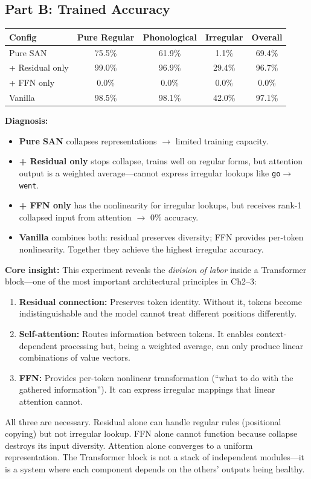 \subsection{Part B: Trained Accuracy}

\begin{center}
\begin{tabular}{lcccc}
\toprule
\textbf{Config} & \textbf{Pure Regular} & \textbf{Phonological} & \textbf{Irregular} & \textbf{Overall} \\
\midrule
Pure SAN & 75.5\% & 61.9\% & 1.1\% & 69.4\% \\
+ Residual only & 99.0\% & 96.9\% & 29.4\% & 96.7\% \\
+ FFN only & 0.0\% & 0.0\% & 0.0\% & 0.0\% \\
Vanilla & 98.5\% & 98.1\% & 42.0\% & 97.1\% \\
\bottomrule
\end{tabular}
\end{center}

\textbf{Diagnosis:}
\begin{itemize}
\item \textbf{Pure SAN} collapses representations $\to$ limited training capacity.
\item \textbf{+ Residual only} stops collapse, trains well on regular forms, but attention output is a weighted average---cannot express irregular lookups like \texttt{go}$\to$\texttt{went}.
\item \textbf{+ FFN only} has the nonlinearity for irregular lookups, but receives rank-1 collapsed input from attention $\to$ 0\% accuracy.
\item \textbf{Vanilla} combines both: residual preserves diversity; FFN provides per-token nonlinearity. Together they achieve the highest irregular accuracy.
\end{itemize}

\textbf{Core insight:} This experiment reveals the \emph{division of labor} inside a Transformer block---one of the most important architectural principles in Ch2--3:
\begin{enumerate}
\item \textbf{Residual connection:} Preserves token identity. Without it, tokens become indistinguishable and the model cannot treat different positions differently.
\item \textbf{Self-attention:} Routes information between tokens. It enables context-dependent processing but, being a weighted average, can only produce linear combinations of value vectors.
\item \textbf{FFN:} Provides per-token nonlinear transformation (``what to do with the gathered information''). It can express irregular mappings that linear attention cannot.
\end{enumerate}
All three are necessary. Residual alone can handle regular rules (positional copying) but not irregular lookup. FFN alone cannot function because collapse destroys its input diversity. Attention alone converges to a uniform representation. The Transformer block is not a stack of independent modules---it is a system where each component depends on the others' outputs being healthy.

